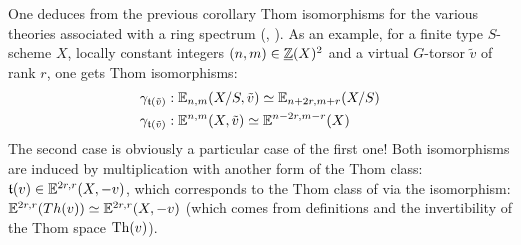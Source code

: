 \begin{num}\label{num:virtual_Thom_iso}
One deduces from the previous corollary Thom isomorphisms for the various theories associated
 with a ring spectrum (, ). As an example,
 for a finite type $S$-scheme $X$, locally constant integers $(n,m) \in \operatorname{\underline {\mathbb{Z}}}(X)^2$ and a virtual $G$-torsor $\tilde v$ of rank $r$,
 one gets Thom isomorphisms:
\begin{equation}\label{eq:virtual_Thom_iso}
\begin{split}
\gamma_{\mathfrak{t}(\tilde v)}&:\mathbb E_{n,m}(X/S,\tilde v) \simeq \mathbb E_{n+2r,m+r}(X/S) \\
\gamma_{\mathfrak{t}(\tilde v)}&:\mathbb E^{n,m}(X,\tilde v) \simeq \mathbb E^{n-2r,m-r}(X)
\end{split}
\end{equation}
The second case is obviously a particular case of the first one!
 Both isomorphisms are induced by multiplication with another form of the Thom
 class: $\mathfrak{t}(v) \in \mathbb E^{2r,r}(X,-v)$, which corresponds to the Thom class of 
 via the isomorphism: $\mathbb E^{2r,r}(Th(v)) \simeq \mathbb E^{2r,r}(X,-v)$
 (which comes from definitions and the invertibility of the Thom space $\operatorname{Th}(v)$).
\end{num}



